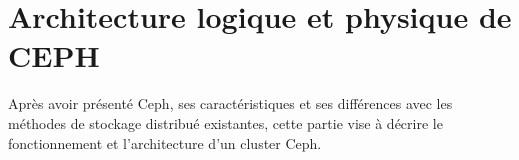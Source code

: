 \chapter{Architecture logique et physique de CEPH}

Après avoir présenté Ceph, ses caractéristiques et ses différences avec les méthodes de stockage distribué existantes, cette partie vise à décrire le fonctionnement et l'architecture d'un cluster Ceph.



